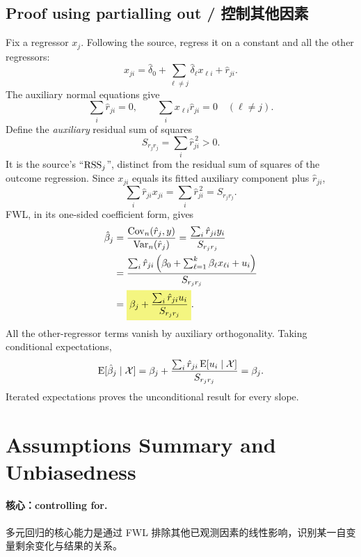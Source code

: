 \subsection{Proof using partialling out / 控制其他因素}
\label{sec:fwl-week4}
Fix a regressor $x_j$. Following the source, regress it on a constant and all the other regressors:
\begin{equation}\label{eq:auxiliary-j}
x_{ji}=\hat\delta_0+\sum_{\ell\ne j}\hat\delta_\ell x_{\ell i}+\hat r_{ji}.
\end{equation}
The auxiliary normal equations give
\[\sum_i\hat r_{ji}=0,\qquad
\sum_i x_{\ell i}\hat r_{ji}=0\quad(\ell\ne j).\]
Define the \emph{auxiliary} residual sum of squares
\[S_{r_jr_j}=\sum_i\hat r_{ji}^{\,2}>0.
\]
It is the source's ``$\operatorname{RSS}_j$'', distinct from the residual sum of squares of the outcome regression. Since $x_{ji}$ equals its fitted auxiliary component plus $\hat r_{ji}$,
\[\sum_i\hat r_{ji}x_{ji}=\sum_i\hat r_{ji}^{\,2}=S_{r_jr_j}.
\]
FWL, in its one-sided coefficient form, gives
\begin{align}
\hat\beta_j
&=\frac{\Cov_n(\hat r_j,y)}{\Var_n(\hat r_j)}
=\frac{\sum_i\hat r_{ji}y_i}{S_{r_jr_j}}\notag\\
&=\frac{\sum_i\hat r_{ji}\left(\beta_0+\sum_{\ell=1}^k\beta_\ell x_{\ell i}+u_i\right)}{S_{r_jr_j}}\notag\\
&=\hm{\beta_j+\frac{\sum_i\hat r_{ji}u_i}{S_{r_jr_j}}}.\label{eq:multiple-slope-error}
\end{align}
All the other-regressor terms vanish by auxiliary orthogonality. Taking conditional expectations,
\[\operatorname{E}[\hat\beta_j\mid\mathcal X]
=\beta_j+\frac{\sum_i\hat r_{ji}\operatorname{E}[u_i\mid\mathcal X]}{S_{r_jr_j}}
=\beta_j.\]
Iterated expectations proves the unconditional result for every slope.

\section{Assumptions Summary and Unbiasedness}
\label{sec:assumptions-summary}
\paragraph{核心：controlling for.}
多元回归的核心能力是通过 FWL 排除其他已观测因素的线性影响，识别某一自变量剩余变化与结果的关系。

